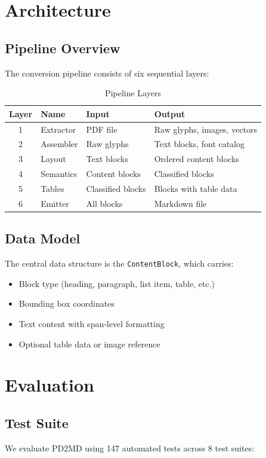 \documentclass[12pt]{article}
\begin{document}
\section{Architecture}

\subsection{Pipeline Overview}
The conversion pipeline consists of six sequential layers:

\begin{table}[h]
\centering
\caption{Pipeline Layers}
\begin{tabular}{clll}
\toprule
\textbf{Layer} & \textbf{Name} & \textbf{Input} & \textbf{Output} \\
\midrule
1 & Extractor & PDF file & Raw glyphs, images, vectors \\
2 & Assembler & Raw glyphs & Text blocks, font catalog \\
3 & Layout & Text blocks & Ordered content blocks \\
4 & Semantics & Content blocks & Classified blocks \\
5 & Tables & Classified blocks & Blocks with table data \\
6 & Emitter & All blocks & Markdown file \\
\bottomrule
\end{tabular}
\end{table}

\subsection{Data Model}
The central data structure is the \texttt{ContentBlock}, which carries:
\begin{itemize}
    \item Block type (heading, paragraph, list item, table, etc.)
    \item Bounding box coordinates
    \item Text content with span-level formatting
    \item Optional table data or image reference
\end{itemize}

\section{Evaluation}

\subsection{Test Suite}
We evaluate PD2MD using 147 automated tests across 8 test suites:
\end{document}

